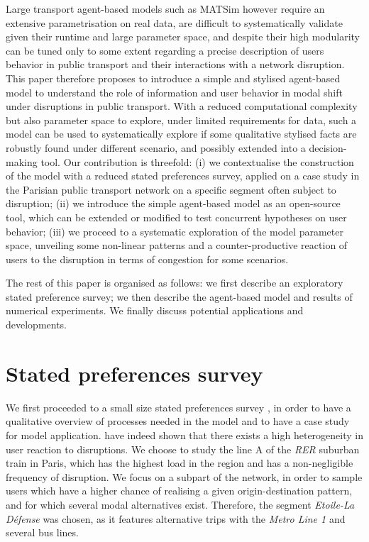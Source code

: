 \documentclass[3p,times,procedia]{elsarticle}
\begin{document}
Large transport agent-based models such as MATSim however require an extensive parametrisation on real data, are difficult to systematically validate given their runtime and large parameter space, and despite their high modularity can be tuned only to some extent regarding a precise description of users behavior in public transport and their interactions with a network disruption. This paper therefore proposes to introduce a simple and stylised agent-based model to understand the role of information and user behavior in modal shift under disruptions in public transport. With a reduced computational complexity but also parameter space to explore, under limited requirements for data, such a model can be used to systematically explore if some qualitative stylised facts are robustly found under different scenario, and possibly extended into a decision-making tool. Our contribution is threefold: (i) we contextualise the construction of the model with a reduced stated preferences survey, applied on a case study in the Parisian public transport network on a specific segment often subject to disruption; (ii) we introduce the simple agent-based model as an open-source tool, which can be extended or modified to test concurrent hypotheses on user behavior; (iii) we proceed to a systematic exploration of the model parameter space, unveiling some non-linear patterns and a counter-productive reaction of users to the disruption in terms of congestion for some scenarios.

The rest of this paper is organised as follows: we first describe an exploratory stated preference survey; we then describe the agent-based model and results of numerical experiments. We finally discuss potential applications and developments.


\section{Stated preferences survey}


We first proceeded to a small size stated preferences survey \citep{kroes1988stated}, in order to have a qualitative overview of processes needed in the model and to have a case study for model application. \cite{martin2016strategies} have indeed shown that there exists a high heterogeneity in user reaction to disruptions. We choose to study the line A of the \emph{RER} suburban train in Paris, which has the highest load in the region and has a non-negligible frequency of disruption. We focus on a subpart of the network, in order to sample users which have a higher chance of realising a given origin-destination pattern, and for which several modal alternatives exist. Therefore, the segment \emph{Etoile-La D{\'e}fense} was chosen, as it features alternative trips with the \emph{Metro Line 1} and several bus lines.
\end{document}
